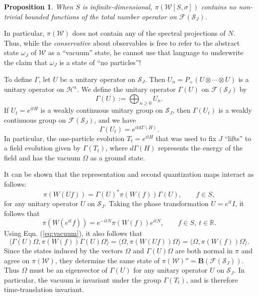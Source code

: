 \documentclass[12pt]{article}
\newtheorem{prop}{Proposition}
\theoremstyle{remark}
\theoremstyle{definition}
\newcommand{\alg}[1]{\mathcal{#1}}
\newcommand{\hil}[1]{\mathcal{#1}}
\begin{document}
\begin{prop} When $S$ is infinite-dimensional, $\pi(\alg{W}[S,\sigma])$
contains no non-trivial bounded functions of the total number operator
  on $\hil{F}(\hil{S}_{J})$.   \label{segal} \end{prop}
  
\noindent In particular, $\pi(\alg{W})$ does not contain any of the spectral 
projections of $N$.  Thus, while the \emph{conservative} about
observables is free to refer to the abstract state $\omega_{J}$ of
$\alg{W}$ as a ``vacuum'' state, he cannot use that language to
underwrite the claim that $\omega_{J}$ is a state of ``no particles''!

To define $\Gamma$, let $U$ be a unitary operator on $\hil{S}_{J}$.  Then
$U_{n}=P_{+}(U\otimes \cdots \otimes U)$ is a unitary operator on
$\hil{H}^{n}$.  We define the unitary operator $\Gamma (U)$ on
$\hil{F}(\hil{S}_{J})$ by
\begin{equation} \Gamma (U):=\bigoplus _{n\geq 0}U_{n} .\end{equation}
If $U_{t}=e^{itH}$ is a weakly continuous unitary group on
$\hil{S}_{J}$, then $\Gamma (U_{t})$ is a weakly continuous group on
$\hil{F}(\hil{S}_{J})$, and we have
\begin{equation} \Gamma (U_{t})=e^{itd\Gamma (H)} .\end{equation}
In particular, the one-particle 
evolution $T_{t}=e^{itH}$ that was used to fix $J$
``lifts''  to a field evolution given by $\Gamma (T_{t})$, where 
$d\Gamma (H)$ represents the energy of the field and has the vacuum $\Omega$ as 
a ground state. 

It can be shown that the representation and second quantization maps
interact as follows: 
\begin{equation}
\pi(W(Uf))=\Gamma (U)^{*}\pi(W(f))\Gamma (U) ,\qquad f\in S,\end{equation}
for any unitary operator $U$ on $\hil{S}_{J}$.  Taking the phase 
transformation $U=e^{it}I$, it follows that
\begin{equation} \label{eq:forty1}
\pi(W(e^{it}f))=e^{-itN}\pi(W(f))e^{itN} ,\qquad f\in S,\ t\in \mathbb{R}. \end{equation}
Using Eqn. (\ref{eq:vacuum}), it also follows that  
\begin{equation}
\langle \Gamma (U)\Omega ,\pi(W(f))\Gamma (U)\Omega \rangle 
=\langle \Omega ,\pi(W(Uf))\Omega
\rangle =\langle \Omega ,\pi(W(f))\Omega
\rangle .  \end{equation}
Since the states induced by the vectors $\Omega$ and $\Gamma 
(U)\Omega$ are both normal in $\pi$ and agree on $\pi(\alg{W})$, they 
determine the same state of 
$\pi(\alg{W})''=\mathbf{B}(\hil{F}(\hil{S}_{J}))$.  Thus 
$\Omega$ must be an eigenvector of $\Gamma
(U)$ for any unitary operator $U$ on $\hil{S}_{J}$.  In particular, 
the vacuum is invariant under the group
$\Gamma(T_{t})$, and is therefore time-translation invariant. 
\end{document}
